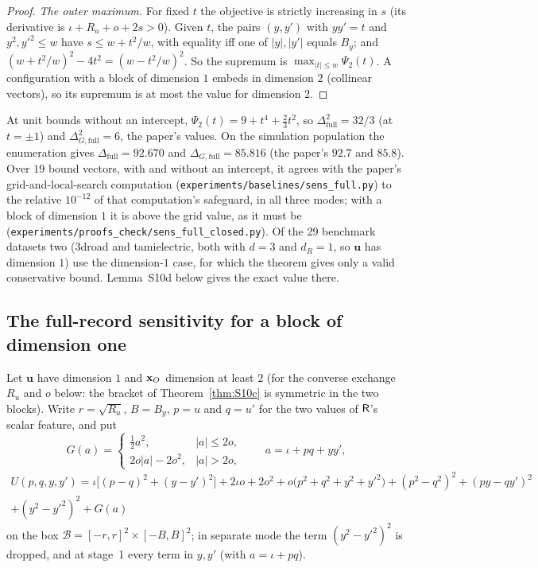 \begin{proof}
\emph{The outer maximum.} For fixed $t$ the objective is strictly increasing in $s$ (its derivative is $\iota+R_u+o+2s>0$). Given $t$, the pairs $(y,y')$ with $yy'=t$ and $y^2,y'^2\le w$ have $s\le w+t^2/w$, with equality iff one of $|y|,|y'|$ equals $B_y$; and $(w+t^2/w)^2-4t^2=(w-t^2/w)^2$. So the supremum is $\max_{|t|\le w}\Psi_2(t)$. A configuration with a block of dimension $1$ embeds in dimension $2$ (collinear vectors), so its supremum is at most the value for dimension $2$.
\end{proof}
At unit bounds without an intercept, $\Psi_2(t)=9+t^4+\tfrac23t^2$, so $\Delta^2_{\mathrm{full}}=32/3$ (at $t=\pm1$) and $\Delta^2_{G,\mathrm{full}}=6$, the paper's values. On the simulation population the enumeration gives $\Delta_{\mathrm{full}}=92.670$ and $\Delta_{G,\mathrm{full}}=85.816$ (the paper's $92.7$ and $85.8$). Over $19$ bound vectors, with and without an intercept, it agrees with the paper's grid-and-local-search computation (\texttt{experiments/baselines/sens\_full.py}) to the relative $10^{-12}$ of that computation's safeguard, in all three modes; with a block of dimension $1$ it is above the grid value, as it must be (\texttt{experiments/proofs\_check/sens\_full\_closed.py}). Of the 29 benchmark datasets two (3droad and tamielectric, both with $d=3$ and $d_R=1$, so $\mathbf u$ has dimension $1$) use the dimension-$1$ case, for which the theorem gives only a valid conservative bound. Lemma~S10d below gives the exact value there.

\subsection{The full-record sensitivity for a block of dimension one}

Let $\mathbf u$ have dimension $1$ and $\mathbf{x}_O$ dimension at least $2$ (for the converse exchange $R_u$ and $o$ below: the bracket of Theorem~\ref{thm:S10c} is symmetric in the two blocks). Write $r=\sqrt{R_u}$, $B=B_y$, $p=u$ and $q=u'$ for the two values of $\mathsf{R}$'s scalar feature, and put
\[
  G(a)=\begin{cases}\tfrac12a^2,&|a|\le2o,\\ 2o|a|-2o^2,&|a|>2o,\end{cases}\qquad a=\iota+pq+yy',
\]
\begin{multline*}
  U(p,q,y,y')=\iota\bigl[(p-q)^2+(y-y')^2\bigr]+2\iota o+2o^2+o\bigl(p^2+q^2+y^2+y'^2\bigr)+(p^2-q^2)^2+(py-qy')^2\\
  +(y^2-y'^2)^2+G(a)
\end{multline*}
on the box $\mathcal B=[-r,r]^2\times[-B,B]^2$; in separate mode the term $(y^2-y'^2)^2$ is dropped, and at stage~1 every term in $y,y'$ (with $a=\iota+pq$).

